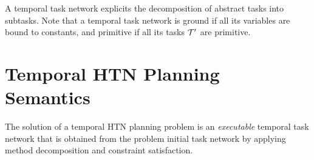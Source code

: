 \documentclass[letterpaper]{article} %
\newtheorem{example}{Example}
\newcommand{\duration}{\text{\it duration}}
\newcommand{\tstart}{\text{\it start}}
\newcommand{\tend}{\text{\it end}}
\begin{document}
A temporal task network explicits the decomposition of abstract tasks into subtasks. %
Note that a temporal task network is ground if all its variables are bound to constants, and primitive if all its tasks ${\cal{T}}'$ are primitive.


\begin{comment}
\begin{example}[${\cal{C}}_o$ constraints]
 For instance, the temporal ordering constraint $\tstart(t_1) < \tend(t_2)$ belonging to ${\cal{C}}_o$ expresses that the start of the task $t_1$ must occur strictly  before the end of the task $t_2$.
  \end{example}

\begin{example}[${\cal{C}}_v$ constraints]
\ldots
  \end{example}

\begin{example}[${\cal{C}}_d$ constraints]
  For instance, let $t_1, t_2 \in {\cal{I}}$ and $w$ a task network; the durative constraints $\duration(t_1) < \duration(t_2)$ expresses that the duration of $t_1$ must be strictly smaller that $t_2$, and the constraint $\duration(w) \geq \duration(t_1) * \duration(t_2)$ expresses that the duration of $w$ is greater or equal to the product of the durations of $t_1$ and $t_2$. Durative constraints can be expressed in terms of start and end events of a task. For instance the previous constraint $\duration(t_1) < \duration(t_2)$ can be expressed as  $\tend(t_1) - \tstart(t_1) < \tend(t_2) - \tstart(t_2)$.
  \end{example}

\begin{example}[${\cal{C}}_t$ constraints]
\ldots
  \end{example}

\end{comment}

%
 \section{Temporal HTN Planning Semantics}
 \label{THTN}

 The solution of a temporal HTN planning problem is an {\it executable} temporal task network that is obtained from the problem initial task network by applying method decomposition and constraint satisfaction.
\end{document}
